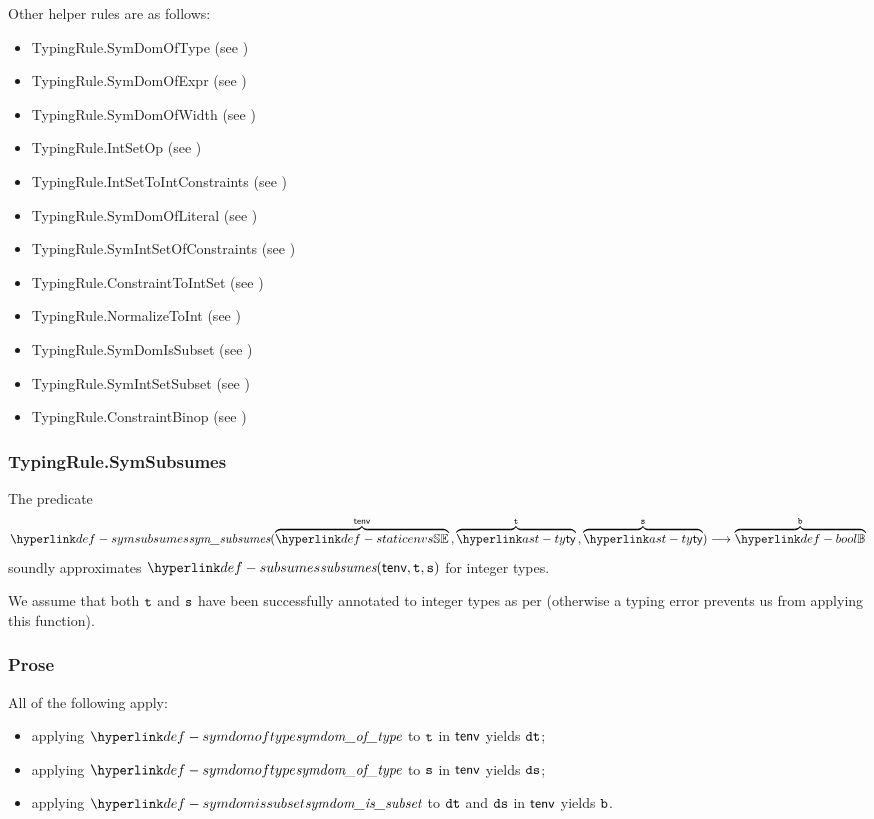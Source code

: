 Other helper rules are as follows:
\begin{itemize}
  \item TypingRule.SymDomOfType (see )
  \item TypingRule.SymDomOfExpr (see )
  \item TypingRule.SymDomOfWidth (see )
  \item TypingRule.IntSetOp (see )
  \item TypingRule.IntSetToIntConstraints (see )
  \item TypingRule.SymDomOfLiteral (see )
  \item TypingRule.SymIntSetOfConstraints (see )
  \item TypingRule.ConstraintToIntSet (see )
  \item TypingRule.NormalizeToInt (see )
  \item TypingRule.SymDomIsSubset (see )
  \item TypingRule.SymIntSetSubset (see )
  \item TypingRule.ConstraintBinop (see )
\end{itemize}

\subsubsection{TypingRule.SymSubsumes \label{sec:TypingRule.SymSubsumes}}
\hypertarget{def-symsubsumes}{}
The predicate
\[
  \symsubsumes(\overname{\staticenvs}{\tenv} \aslsep \overname{\ty}{\vt} \aslsep \overname{\ty}{\vs})
  \aslto \overname{\Bool}{\vb}
\]
soundly approximates $\subsumes(\tenv, \vt, \vs)$ for integer types.
\ProseOtherwiseTypeError

We assume that both $\texttt{t}$ and $\texttt{s}$ have been successfully annotated to integer types as per 
(otherwise a typing error prevents us from applying this function).

\subsubsection{Prose}
All of the following apply:
\begin{itemize}
  \item applying $\symdomoftype$ to $\texttt{t}$ in $\textsf{tenv}$ yields $\texttt{dt}$;
  \item applying $\symdomoftype$ to $\texttt{s}$ in $\textsf{tenv}$ yields $\texttt{ds}$;
  \item applying $\symdomissubset$ to $\texttt{dt}$ and $\texttt{ds}$ in $\textsf{tenv}$ yields $\texttt{b}$.
\end{itemize}

